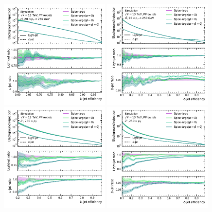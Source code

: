 \begin{figure}[ht]
    \centering
    \includegraphics[width=0.49\textwidth]{figures/flavour_tagging/b_roc_ttbar_aux.pdf}
    \includegraphics[width=0.49\textwidth]{figures/flavour_tagging/c_roc_ttbar_aux.pdf}
    \includegraphics[width=0.49\textwidth]{figures/flavour_tagging/b_roc_zprime_aux.pdf}
    \includegraphics[width=0.49\textwidth]{figures/flavour_tagging/c_roc_zprime_aux.pdf}

\end{figure}
